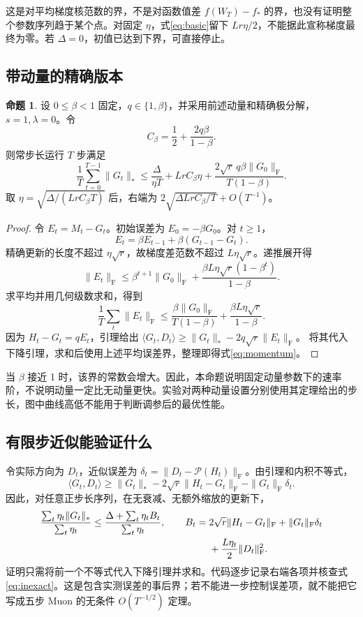 \documentclass[11pt,a4paper]{article}
\theoremstyle{definition}
\newtheorem{theorem}{命题}
\newcommand{\F}{\mathrm{F}}
\newcommand{\Pol}{\mathcal{P}}
\begin{document}
这是对平均梯度核范数的界，不是对函数值差 $f(W_T)-f_*$ 的界，也没有证明整个参数序列趋于某个点。对固定 $\eta$，式\eqref{eq:basic}留下 $Lr\eta/2$，不能据此宣称梯度最终为零。若 $\Delta=0$，初值已达到下界，可直接停止。

\subsection{带动量的精确版本}
\begin{theorem}
设 $0\le\beta<1$ 固定，$q\in\{1,\beta\}$，并采用前述动量和精确极分解，$s=1,\lambda=0$。令
\[
 C_\beta=\frac12+\frac{2q\beta}{1-\beta}.
\]
则常步长运行 $T$ 步满足
\begin{equation}
 \frac1T\sum_{t=0}^{T-1}\|G_t\|_*
 \le \frac{\Delta}{\eta T}+Lr C_\beta\eta
 +\frac{2\sqrt r\,q\beta\|G_0\|_\F}{T(1-\beta)}.
 \label{eq:momentum}
\end{equation}
取 $\eta=\sqrt{\Delta/(LrC_\beta T)}$ 后，右端为
$2\sqrt{\Delta LrC_\beta/T}+O(T^{-1})$。
\end{theorem}
\begin{proof}
令 $E_t=M_t-G_t$。初始误差为 $E_0=-\beta G_0$。对 $t\ge1$，
\[
E_t=\beta E_{t-1}+\beta(G_{t-1}-G_t).
\]
精确更新的长度不超过 $\eta\sqrt r$，故梯度差范数不超过 $L\eta\sqrt r$。递推展开得
\[
 \|E_t\|_\F\le\beta^{t+1}\|G_0\|_\F
 +\frac{\beta L\eta\sqrt r(1-\beta^t)}{1-\beta}.
\]
求平均并用几何级数求和，得到
\begin{equation}
 \frac1T\sum_t\|E_t\|_\F
 \le\frac{\beta\|G_0\|_\F}{T(1-\beta)}
 +\frac{\beta L\eta\sqrt r}{1-\beta}.
\end{equation}
因为 $H_t-G_t=qE_t$，引理给出
$\langle G_t,D_t\rangle\ge\|G_t\|_*-2q\sqrt r\|E_t\|_\F$。
将其代入下降引理，求和后使用上述平均误差界，整理即得式\eqref{eq:momentum}。
\end{proof}
当 $\beta$ 接近 1 时，该界的常数会增大。因此，本命题说明固定动量参数下的速率阶，不说明动量一定比无动量更快。实验对两种动量设置分别使用其定理给出的步长，图中曲线高低不能用于判断调参后的最优性能。

\subsection{有限步近似能验证什么}
令实际方向为 $D_t$，近似误差为
$\delta_t=\|D_t-\Pol(H_t)\|_\F$。由引理和内积不等式，
\begin{equation}
\langle G_t,D_t\rangle\ge\|G_t\|_*
-2\sqrt r\|H_t-G_t\|_\F-\|G_t\|_\F\delta_t.
\end{equation}
因此，对任意正步长序列，在无衰减、无额外缩放的更新下，
\begin{align}
\frac{\sum_t\eta_t\|G_t\|_*}{\sum_t\eta_t}
\le \frac{\Delta+\sum_t\eta_t B_t}{\sum_t\eta_t},\qquad
B_t={}&2\sqrt r\|H_t-G_t\|_\F+\|G_t\|_\F\delta_t\notag\\
&+\frac{L\eta_t}{2}\|D_t\|_\F^2.
\label{eq:inexact}
\end{align}
证明只需将前一个不等式代入下降引理并求和。代码逐步记录右端各项并核查式\eqref{eq:inexact}。这是包含实测误差的事后界；若不能进一步控制误差项，就不能把它写成五步 Muon 的无条件 $O(T^{-1/2})$ 定理。
\end{document}
